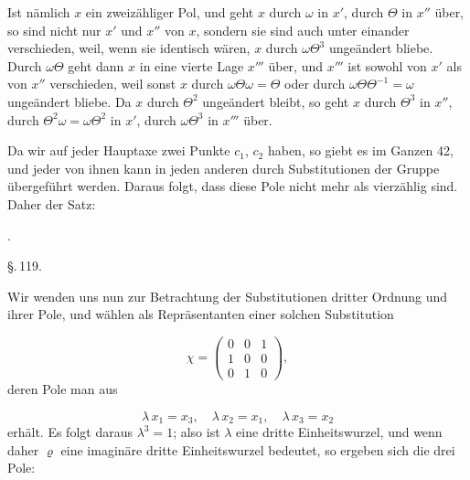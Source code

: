 Ist n\"amlich $x$ ein zweiz\"ahliger Pol, und geht $x$ durch $\omega$ in $x'$, durch $\Theta$ in $x''$ \"uber, so sind nicht nur $x'$ und $x''$ von $x$, sondern sie sind auch unter einander verschieden, weil, wenn sie identisch w\"aren, $x$ durch $\omega\Theta^3$ unge\"andert bliebe. Durch $\omega\Theta$ geht dann $x$ in eine vierte Lage $x'''$ \"uber, und $x'''$ ist sowohl von $x'$ als von $x''$ verschieden, weil sonst $x$ durch $\omega\Theta\omega = \Theta$ oder durch $\omega\Theta\Theta^{-1} = \omega$ unge\"andert bliebe. Da $x$ durch $\Theta^2$ unge\"andert bleibt, so geht $x$ durch $\Theta^3$ in $x''$, durch $\Theta^2\omega = \omega\Theta^2$ in $x'$, durch $\omega\Theta^3$ in $x'''$ \"uber.

Da wir auf jeder Hauptaxe zwei Punkte $c_1$, $c_2$ haben, so giebt es im Ganzen 42, und jeder von ihnen kann in jeden anderen durch Substitutionen der Gruppe \"ubergef\"uhrt werden. Daraus folgt, dass diese Pole nicht mehr als vierz\"ahlig sind. Daher der Satz:

.\ 

\begin{center}
\S.\,119.

\end{center}

Wir wenden uns nun zur Betrachtung der Substitutionen dritter Ordnung und ihrer Pole, und w\"ahlen als Repr\"asentanten einer solchen Substitution

\[
\chi = \begin{pmatrix} 0 & 0 & 1\\ 1 & 0 & 0\\ 0 & 1 & 0 \end{pmatrix},
\]
deren Pole man aus

\[
\lambda\,x_1 = x_3, \quad \lambda\,x_2 = x_1, \quad \lambda\,x_3 = x_2
\]
erh\"alt. Es folgt daraus $\lambda^3 = 1$; also ist $\lambda$ eine dritte Einheitswurzel, und wenn daher $\varrho$ eine imagin\"are dritte Einheitswurzel bedeutet, so ergeben sich die drei Pole:

